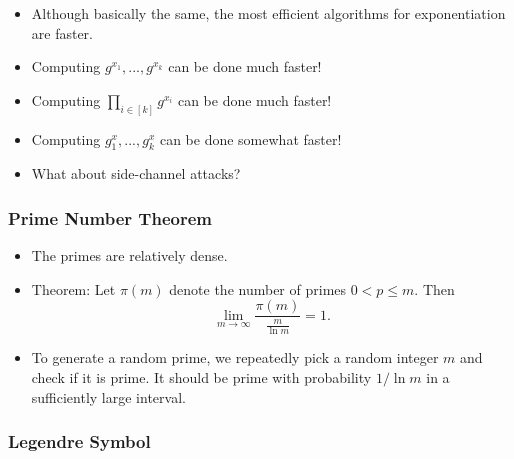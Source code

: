 \documentclass[a4paper]{scrartcl}
\begin{document}
\begin{itemize}
\item Although basically the same, the most efficient algorithms for exponentiation are faster.
\item Computing $g^{x_1},...,g^{x_k}$ can be done much faster!
\item Computing $\prod_{i \in [k]} g^{x_i}$ can be done much faster!
\item Computing $g_1^x,...,g_k^x$ can be done somewhat faster!
\item What about side-channel attacks?
\end{itemize}

\subsubsection*{Prime Number Theorem}

\begin{itemize}
\item The primes are relatively dense.
\item Theorem: Let $\pi(m)$ denote the number of primes $0<p\leq m$. Then 
$$\lim_{m \rightarrow \infty} \frac{\pi(m)}{\frac{m}{\ln m}} = 1.$$
\item To generate a random prime, we repeatedly pick a random integer $m$ and check if it is prime. It should be prime with probability $1/\ln m$ in a sufficiently large interval.
\end{itemize}

\subsubsection*{Legendre Symbol}
\end{document}
